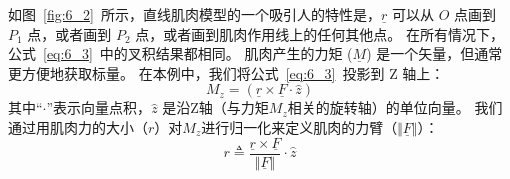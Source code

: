如图~\ref{fig:6_2}~所示，直线肌肉模型的一个吸引人的特性是，$\underline{r}$ 可以从 $O$ 点画到 $P_1$ 点，或者画到 $P_2$ 点，或者画到肌肉作用线上的任何其他点。
在所有情况下，公式~\ref{eq:6_3}~中的叉积结果都相同。
肌肉产生的力矩 ($\underline{M}$) 是一个矢量，但通常更方便地获取标量。
在本例中，我们将公式~\ref{eq:6_3}~投影到 Z 轴上：
%
\begin{equation}
	M_z = ( \underline{r} \times \underline{F} \cdot \hat{z} )
	\label{eq:6_4}
\end{equation}
%
其中“$\cdot$”表示向量点积，$\hat{z}$ 是沿Z轴（与力矩$M_z$相关的旋转轴）的单位向量。
我们通过用肌肉力的大小（$r$）对$M_z$进行归一化来定义肌肉的力臂（$ \Vert \underline{F} \Vert $）：
%
\begin{equation}
	r \triangleq 
		\frac{
			\underline{r} \times \underline{F}
		}{
			\Vert \underline{F} \Vert
		}
		\cdot
		\hat{z}
	\label{eq:6_5}
\end{equation}












